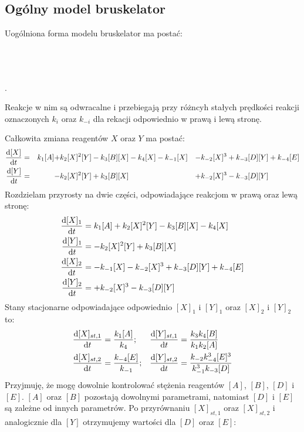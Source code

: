 \documentclass[10pt, a4paper, twoside, onecolumn]{article}
\numberwithin{equation}{section}
\begin{document}
	\subsection{Ogólny model bruskelator}
	Uogólniona forma modelu bruskelator ma postać:
	\begin{center}
		 \\
		 \\
		 \\
		.
	\end{center}
	Reakcje w nim są odwracalne i przebiegają przy różncyh stałych prędkości reakcji oznaczonych \(k_{i}\) oraz \(k_{-i}\) dla rekacji odpowiednio w prawą i lewą stronę. \par
	Całkowita zmiana reagentów \(X\) oraz \(Y\) ma postać:
	\begin{align}
		\dv{[X]}{t} &=& k_{1}[A] +& k_{2}[X]^{2}[Y] - k_{3}[B][X] - k_{4}[X] - k_{-1}[X] &-& k_{-2}[X]^{3} + k_{-3}[D][Y] + k_{-4}[E] \\
		\dv{[Y]}{t} &=& -& k_{2}[X]^{2}[Y] + k_{3}[B][X] &+& k_{-2}[X]^{3} - k_{-3}[D][Y]
	\end{align}
	Rozdzielam przyrosty na dwie części, odpowiadające reakcjom w prawą oraz lewą stronę:
	\begin{align}
		\dv{[X]_{1}}{t} &= k_{1}[A] + k_{2}[X]^{2}[Y] - k_{3}[B][X] - k_{4}[X] \\
		\dv{[Y]_{1}}{t} &= - k_{2}[X]^{2}[Y] + k_{3}[B][X] \\
		\dv{[X]_{2}}{t} &= - k_{-1}[X] - k_{-2}[X]^{3} + k_{-3}[D][Y] + k_{-4}[E] \\
		\dv{[Y]_{2}}{t} &= + k_{-2}[X]^{3} - k_{-3}[D][Y]
	\end{align}
	Stany stacjonarne odpowiadające odpowiednio \([X]_{1}\) i \([Y]_{1}\) oraz \([X]_{2}\) i \([Y]_{2}\) to:
	\begin{align}
		\dv{[X]_{st, 1}}{t} &= \frac{k_{1}[A]}{k_{4}}; & \dv{[Y]_{st, 1}}{t} &= \frac{k_{3}k_{4}[B]}{k_{1}k_{2}[A]} \\
		\dv{[X]_{st, 2}}{t} &= \frac{k_{-4}[E]}{k_{-1}}; & \dv{[Y]_{st, 2}}{t} &= \frac{k_{-2}k_{-4}^{3}[E]^{3}}{k_{-1}^{3}k_{-3}[D]}
	\end{align}
	Przyjmuję, że mogę dowolnie kontrolować stężenia reagentów \([A]\), \([B]\), \([D]\) i \([E]\). \([A]\) oraz \([B]\) pozostają dowolnymi parametrami, natomiast \([D]\) i \([E]\) są zależne od innych parametrów. Po przyrównaniu \([X]_{st, 1}\) oraz \([X]_{st, 2}\) i analogicznie dla \([Y]\) otrzymujemy wartości dla \([D]\) oraz \([E]\):
\end{document}
